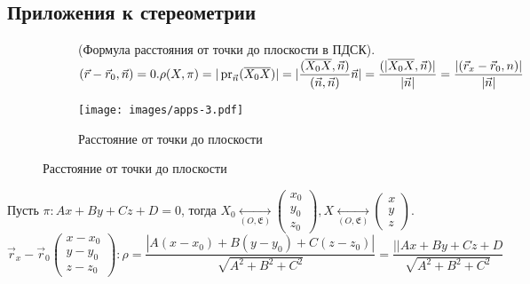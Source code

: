 \subsection{Приложения к стереометрии}
\begin{enumerate}

	\begin{figure}[h]
		\begin{subfigure}[t!]{0.6\linewidth}
			\item (Формула расстояния от точки до плоскости в ПДСК). \((\vec r - \vec r_0, \vec n) = 0. \rho(X,\pi) = |\operatorname{pr}_{\vec n}(\overline{X_0X})| = |\dfrac{(\overline{X_0X}, \vec n)}{(\vec n, \vec n)}\vec n| = \dfrac{(|\overline{X_0X}, \vec n)|}{|\vec{n}|} = \dfrac{|(\vec r_x - \vec r_0, n)|}{|\vec n|}\)
		\end{subfigure}
		\begin{subfigure}[b!]{0.4\linewidth}
			\centering
			\texttt{[image: images/apps-3.pdf]}
			\caption*{Расстояние от точки до плоскости}
			\label{Apps1}
		\end{subfigure}
	\end{figure}
	
	\item Пусть \(\pi: Ax+By+Cz+D = 0\), тогда \(X_0\underset{(O,\mathfrak{E})}{\longleftrightarrow}\begin{pmatrix}
		x_0 \\ y_0 \\ z_0
	\end{pmatrix}, 
	X\underset{(O,\mathfrak{E})}{\longleftrightarrow}\begin{pmatrix}
		x \\ y \\ z
	\end{pmatrix}\). \(\vec r_x - \vec r_0 \begin{pmatrix}
		x- x_0 \\ y - y_0 \\ z-z_0
	\end{pmatrix}: \rho = \dfrac{|A(x-x_0)+B(y-y_0)+C(z-z_0)|}{\sqrt{A^2+B^2+C^2}} = \dfrac{||Ax+By+Cz+D}{\sqrt{A^2+B^2+C^2}}\)
	

\end{enumerate}
